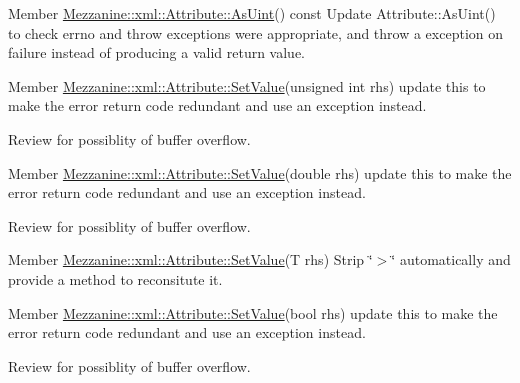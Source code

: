 \begin{DoxyDescription}
\item[Member \hyperlink{classMezzanine_1_1xml_1_1Attribute_a5933a59c21bf71049ea71750f4c69bc3}{Mezzanine::xml::Attribute::AsUint}() const  ]Update Attribute::AsUint() to check errno and throw exceptions were appropriate, and throw a exception on failure instead of producing a valid return value. 
\end{DoxyDescription}

\label{todo__todo000052}
\hypertarget{todo__todo000052}{}
 
\begin{DoxyDescription}
\item[Member \hyperlink{classMezzanine_1_1xml_1_1Attribute_a3c47acd1ef9cdf05f312fa954cf988a6}{Mezzanine::xml::Attribute::SetValue}(unsigned int rhs) ]update this to make the error return code redundant and use an exception instead. 

Review for possiblity of buffer overflow. 
\end{DoxyDescription}

\label{todo__todo000053}
\hypertarget{todo__todo000053}{}
 
\begin{DoxyDescription}
\item[Member \hyperlink{classMezzanine_1_1xml_1_1Attribute_aa6f33397178b9823d85906692320a440}{Mezzanine::xml::Attribute::SetValue}(double rhs) ]update this to make the error return code redundant and use an exception instead. 

Review for possiblity of buffer overflow. 
\end{DoxyDescription}

\label{todo__todo000055}
\hypertarget{todo__todo000055}{}
 
\begin{DoxyDescription}
\item[Member \hyperlink{classMezzanine_1_1xml_1_1Attribute_ab4ab2fb15cd198cd8527d796583cf994}{Mezzanine::xml::Attribute::SetValue}(T rhs) ]Strip \char`\"{}$>$\char`\"{} automatically and provide a method to reconsitute it. 
\end{DoxyDescription}

\label{todo__todo000054}
\hypertarget{todo__todo000054}{}
 
\begin{DoxyDescription}
\item[Member \hyperlink{classMezzanine_1_1xml_1_1Attribute_a4b4b035128dfe3c7fd70e228c70d5118}{Mezzanine::xml::Attribute::SetValue}(bool rhs) ]update this to make the error return code redundant and use an exception instead. 

Review for possiblity of buffer overflow. 
\end{DoxyDescription}

